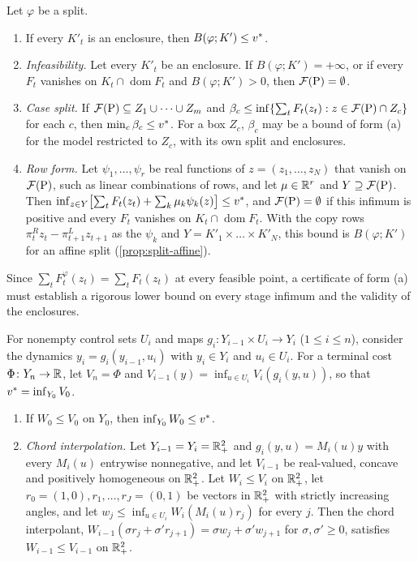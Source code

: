 \begin{lemma}\label{lem:split-bound}
Let $\varphi$ be a split.
\begin{enumerate}
\item[(a)] If every $K'_t$ is an enclosure, then $B(\varphi;K')\le\vstar$.
\item[(b)] \emph{Infeasibility.} Let every $K'_t$ be an enclosure.
  If $B(\varphi;K')=+\infty$, or if every $F_t$ vanishes on $K_t\cap\operatorname{dom}F_t$ and $B(\varphi;K')>0$, then $\feas[\mathrm P]=\emptyset$.
\item[(c)] \emph{Case split.} If $\feas[\mathrm P]\subseteq Z_1\cup\dots\cup Z_m$ and $\beta_c\le\inf\{\sum_tF_t(z_t):z\in\feas[\mathrm P]\cap Z_c\}$ for each $c$, then $\min_c\beta_c\le\vstar$.
  For a box $Z_c$, $\beta_c$ may be a bound of form (a) for the model restricted to $Z_c$, with its own split and enclosures.
\item[(d)] \emph{Row form.} Let $\psi_1,\dots,\psi_r$ be real functions of $z=(z_1,\dots,z_N)$ that vanish on $\feas[\mathrm P]$, such as linear combinations of rows, and let $\mu\in\R^r$ and $Y\supseteq\feas[\mathrm P]$.
  Then $\inf_{z\in Y}\bigl[\sum_tF_t(z_t)+\sum_k\mu_k\psi_k(z)\bigr]\le\vstar$, and $\feas[\mathrm P]=\emptyset$ if this infimum is positive and every $F_t$ vanishes on $K_t\cap\operatorname{dom}F_t$.
  With the copy rows $\pi^R_tz_t-\pi^L_{t+1}z_{t+1}$ as the $\psi_k$ and $Y=K'_1\times\dots\times K'_N$, this bound is $B(\varphi;K')$ for an affine split (\cref{prop:split-affine}).
\end{enumerate}
\end{lemma}

Since $\sum_tF^\varphi_t(z_t)=\sum_tF_t(z_t)$ at every feasible point, a certificate of form (a) must establish a rigorous lower bound on every stage infimum and the validity of the enclosures.

For nonempty control sets $U_i$ and maps $g_i\colon Y_{i-1}\times U_i\to Y_i$ ($1\le i\le n$), consider the dynamics $y_i=g_i(y_{i-1},u_i)$ with $y_i\in Y_i$ and $u_i\in U_i$.
For a terminal cost $\Phi\colon Y_n\to\R$, let $V_n=\Phi$ and $V_{i-1}(y)=\inf_{u\in U_i}V_i(g_i(y,u))$, so that $\vstar=\inf_{Y_0}V_0$.

\begin{lemma}\label{lem:split-minorant}
\begin{enumerate}
\item[(a)] If $W_0\le V_0$ on $Y_0$, then $\inf_{Y_0}W_0\le\vstar$.
\item[(b)] \emph{Chord interpolation.} Let $Y_{i-1}=Y_i=\R^2_+$ and $g_i(y,u)=M_i(u)y$ with every $M_i(u)$ entrywise nonnegative, and let $V_{i-1}$ be real-valued, concave and positively homogeneous on $\R^2_+$.
  Let $W_i\le V_i$ on $\R^2_+$, let $r_0=(1,0),r_1,\dots,r_J=(0,1)$ be vectors in $\R^2_+$ with strictly increasing angles, and let $w_j\le\inf_{u\in U_i}W_i(M_i(u)r_j)$ for every $j$.
  Then the chord interpolant, $W_{i-1}(\sigma r_j+\sigma'r_{j+1})=\sigma w_j+\sigma'w_{j+1}$ for $\sigma,\sigma'\ge0$, satisfies $W_{i-1}\le V_{i-1}$ on $\R^2_+$.
\end{enumerate}
\end{lemma}

